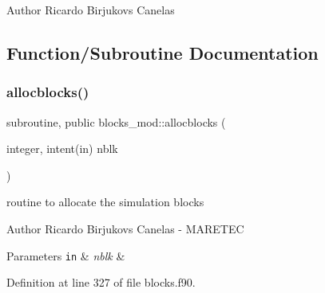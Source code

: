 \begin{DoxyAuthor}{Author}
Ricardo Birjukovs Canelas 
\end{DoxyAuthor}


\subsection{Function/\+Subroutine Documentation}
\mbox{\label{namespaceblocks__mod_a639beb0fee2290d46353f4b4702d6711}} 
\subsubsection{\texorpdfstring{allocblocks()}{allocblocks()}}
{\footnotesize\ttfamily subroutine, public blocks\+\_\+mod\+::allocblocks (\begin{DoxyParamCaption}\item[{integer, intent(in)}]{nblk }\end{DoxyParamCaption})}



routine to allocate the simulation blocks 

\begin{DoxyAuthor}{Author}
Ricardo Birjukovs Canelas -\/ M\+A\+R\+E\+T\+EC
\end{DoxyAuthor}

\begin{DoxyParams}[1]{Parameters}
\mbox{\tt in}  & {\em nblk} & \\
\hline
\end{DoxyParams}


Definition at line 327 of file blocks.\+f90.


